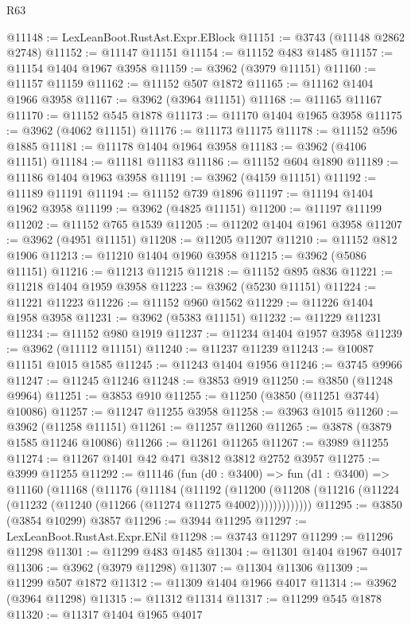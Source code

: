 \begin{lexlean}{R63}
\begin{coremodule}
@11148 := LexLeanBoot.RustAst.Expr.EBlock
@11151 := @3743 (@11148 @2862 @2748)
@11152 := @11147 @11151
@11154 := @11152 @483 @1485
@11157 := @11154 @1404 @1967 @3958
@11159 := @3962 (@3979 @11151)
@11160 := @11157 @11159
@11162 := @11152 @507 @1872
@11165 := @11162 @1404 @1966 @3958
@11167 := @3962 (@3964 @11151)
@11168 := @11165 @11167
@11170 := @11152 @545 @1878
@11173 := @11170 @1404 @1965 @3958
@11175 := @3962 (@4062 @11151)
@11176 := @11173 @11175
@11178 := @11152 @596 @1885
@11181 := @11178 @1404 @1964 @3958
@11183 := @3962 (@4106 @11151)
@11184 := @11181 @11183
@11186 := @11152 @604 @1890
@11189 := @11186 @1404 @1963 @3958
@11191 := @3962 (@4159 @11151)
@11192 := @11189 @11191
@11194 := @11152 @739 @1896
@11197 := @11194 @1404 @1962 @3958
@11199 := @3962 (@4825 @11151)
@11200 := @11197 @11199
@11202 := @11152 @765 @1539
@11205 := @11202 @1404 @1961 @3958
@11207 := @3962 (@4951 @11151)
@11208 := @11205 @11207
@11210 := @11152 @812 @1906
@11213 := @11210 @1404 @1960 @3958
@11215 := @3962 (@5086 @11151)
@11216 := @11213 @11215
@11218 := @11152 @895 @836
@11221 := @11218 @1404 @1959 @3958
@11223 := @3962 (@5230 @11151)
@11224 := @11221 @11223
@11226 := @11152 @960 @1562
@11229 := @11226 @1404 @1958 @3958
@11231 := @3962 (@5383 @11151)
@11232 := @11229 @11231
@11234 := @11152 @980 @1919
@11237 := @11234 @1404 @1957 @3958
@11239 := @3962 (@11112 @11151)
@11240 := @11237 @11239
@11243 := @10087 @11151 @1015 @1585
@11245 := @11243 @1404 @1956
@11246 := @3745 @9966
@11247 := @11245 @11246
@11248 := @3853 @919
@11250 := @3850 (@11248 @9964)
@11251 := @3853 @910
@11255 := @11250 (@3850 (@11251 @3744) @10086)
@11257 := @11247 @11255 @3958
@11258 := @3963 @1015
@11260 := @3962 (@11258 @11151)
@11261 := @11257 @11260
@11265 := @3878 (@3879 @1585 @11246 @10086)
@11266 := @11261 @11265
@11267 := @3989 @11255
@11274 := @11267 @1401 @42 @471 @3812 @3812 @2752 @3957
@11275 := @3999 @11255
@11292 := @11146
    (fun (d0 : @3400) =>
    fun (d1 : @3400) =>
    @11160
      (@11168
        (@11176
          (@11184
            (@11192
              (@11200
                (@11208 (@11216 (@11224 (@11232 (@11240 (@11266 (@11274 @11275 @4002)))))))))))))
@11295 := @3850 (@3854 @10299) @3857
@11296 := @3944 @11295
@11297 := LexLeanBoot.RustAst.Expr.ENil
@11298 := @3743 @11297
@11299 := @11296 @11298
@11301 := @11299 @483 @1485
@11304 := @11301 @1404 @1967 @4017
@11306 := @3962 (@3979 @11298)
@11307 := @11304 @11306
@11309 := @11299 @507 @1872
@11312 := @11309 @1404 @1966 @4017
@11314 := @3962 (@3964 @11298)
@11315 := @11312 @11314
@11317 := @11299 @545 @1878
@11320 := @11317 @1404 @1965 @4017

\end{coremodule}
\end{lexlean}
